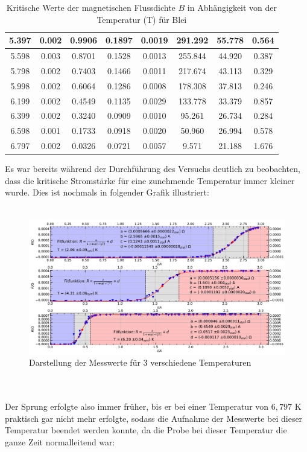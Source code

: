 \documentclass[german,  %
parskip=full,  %
]{scrartcl}
\begin{document}
\begin{table} [h!]
\begin{tabular}{|c|c|c|c|c|c|c|c|}
5.397 & 0.002 & 0.9906 & 0.1897 & 0.0019 & 291.292 & 55.778 & 0.564\\\hline
5.598 & 0.003 & 0.8701 & 0.1528 & 0.0013 & 255.844 & 44.920 & 0.387\\\hline
5.798 & 0.002 & 0.7403 & 0.1466 & 0.0011 & 217.674 & 43.113 & 0.329\\\hline
5.998 & 0.002 & 0.6064 & 0.1286 & 0.0008 & 178.308 & 37.813 & 0.246\\\hline
6.199 & 0.002 & 0.4549 & 0.1135 & 0.0029 & 133.778 & 33.379 & 0.857\\\hline
6.399 & 0.002 & 0.3240 & 0.0909 & 0.0010 & 95.261 & 26.734 & 0.284\\\hline
6.598 & 0.001 & 0.1733 & 0.0918 & 0.0020 & 50.960 & 26.994 & 0.578\\\hline
6.797 & 0.002 & 0.0326 & 0.0721 & 0.0057 & 9.571 & 21.188 & 1.676\\\hline
\end{tabular}
\caption{Kritische Werte der magnetischen Flussdichte \(B\) in Abhängigkeit von der Temperatur (T) für Blei}
\label{t} 
\end{table}
\newpage
Es war bereits während der Durchführung des Versuchs deutlich zu beobachten, dass die kritische Stromstärke für eine zunehmende Temperatur immer kleiner wurde. Dies ist nochmals in folgender Grafik illustriert:
\\\\
\begin{figure}[h!]
\centering
\includegraphics[width=\textwidth]{verschiedene_Temperaturen}
\caption{Darstellung der Messwerte für 3 verschiedene Temperaturen}
\end{figure}
\\\\
Der Sprung erfolgte also immer früher, bis er bei einer Temperatur von $6,797$ K praktisch gar nicht mehr erfolgte, sodass die Aufnahme der Messwerte bei dieser Temperatur beendet werden konnte, da die Probe bei dieser Temperatur die ganze Zeit normalleitend war:
\end{document}
